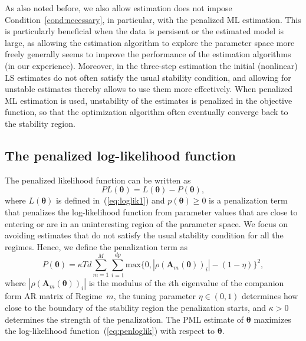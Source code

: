 \documentclass[nojss]{jss}
\begin{document}
As also noted before, we also allow estimation does not impose Condition~\ref{cond:necessary}, in particular, with the penalized ML estimation. This is particularly beneficial when the data is persisent or the estimated model is large, as allowing the estimation algorithm to explore the parameter space more freely generally seems to improve the performance of the estimation algorithms (in our experience). Moreover, in the three-step estimation the initial (nonlinear) LS estimates do not often satisfy the usual stability condition, and allowing for unstable estimates thereby allows to use them more effectively. When penalized ML estimation is used, unstability of the estimates is penalized in the objective function, so that the optimization algorithm often eventually converge back to the stability region.

\subsection{The penalized log-likelihood function}

The penalized likelihood function can be written as
\begin{equation}\label{eq:penloglik}
PL(\boldsymbol{\theta}) = L(\boldsymbol{\theta}) - P(\boldsymbol{\theta}),
\end{equation}
where $L(\boldsymbol{\theta})$ is defined in~(\ref{eq:loglik1}) and $p(\boldsymbol{\theta})\geq 0$ is a penalization term that penalizes the log-likelihood function from parameter values that are close to entering or are in an uninteresting region of the parameter space. We focus on avoiding estimates that do not satisfy the usual stability condition for all the regimes. Hence, we define the penalization term as
\begin{equation}\label{eq:penterm}
P(\boldsymbol{\theta}) = \kappa Td \sum_{m=1}^M\sum_{i=1}^{dp} \text{max}\lbrace 0, |\rho(\boldsymbol{A}_m(\boldsymbol{\theta}))_i| - (1 - \eta) \rbrace^2,
\end{equation}
where $|\rho(\boldsymbol{A}_m(\boldsymbol{\theta}))_i|$ is the modulus of the $i$th eigenvalue of the companion form AR matrix of Regime~$m$, the tuning parameter $\eta\in (0, 1)$ determines how close to the boundary of the stability region the penalization starts, and $\kappa>0$ determines the strength of the penalization. The PML estimate of $\boldsymbol{\theta}$ maximizes the log-likelihood function~(\ref{eq:penloglik}) with respect to $\boldsymbol{\theta}$.
\end{document}
